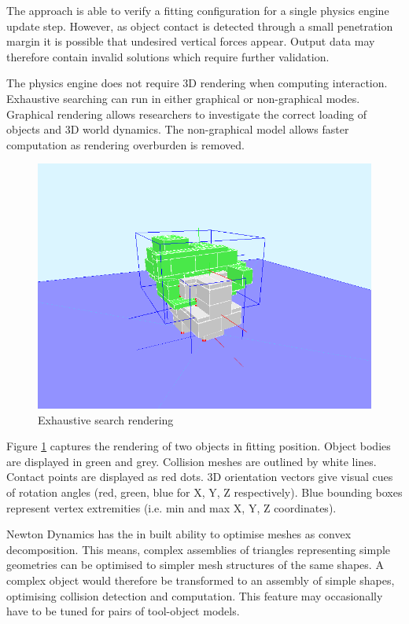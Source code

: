 \documentclass[11]{article}
\begin{document}
The approach is able to verify a fitting configuration for a single physics engine update step.
However, as object contact is detected through a small penetration margin it is possible that undesired vertical forces appear.
Output data may therefore contain invalid solutions which require further validation.

The physics engine does not require 3D rendering when computing interaction. 
Exhaustive searching can run in either graphical or non-graphical modes.
Graphical rendering allows researchers to investigate the correct loading of objects and 3D world dynamics.
The non-graphical model allows faster computation as rendering overburden is removed. 

\begin{figure}[h]
  \centering
  \includegraphics[width=.7\textwidth]{figures/newton_simulation.png}
  \caption{Exhaustive search rendering}
  \label{fig:newton_simulation}
\end{figure}      

Figure \ref{fig:newton_simulation} captures the rendering of two objects in fitting position.
Object bodies are displayed in green and grey.
Collision meshes are outlined by white lines.
Contact points are displayed as red dots.
3D orientation vectors give visual cues of rotation angles (red, green, blue for X, Y, Z respectively).
Blue bounding boxes represent vertex extremities (i.e. min and max X, Y, Z coordinates).
 
Newton Dynamics has the in built ability to optimise meshes as convex decomposition.
This means, complex assemblies of triangles representing simple geometries can be optimised to simpler mesh structures of the same shapes. 
A complex object would therefore be transformed to an assembly of simple shapes, optimising collision detection and computation. 
This feature may occasionally have to be tuned for pairs of tool-object models.
\end{document}
